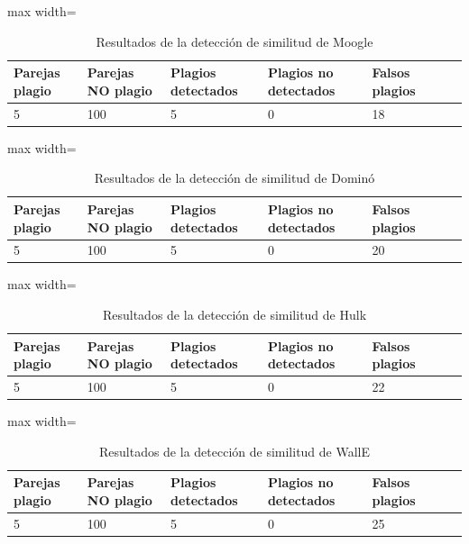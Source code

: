\begin{table}[ht]
\centering
\begin{adjustbox}{max width=\textwidth}
\begin{tabular}{|p{2cm}|p{2cm}|p{2cm}|p{2cm}|p{2cm}|p{2cm}|p{2cm}|}
\hline
\textbf{Parejas plagio} & \textbf{Parejas NO plagio} & \textbf{Plagios detectados} & \textbf{Plagios no detectados} & \textbf{Falsos plagios}  \\ \hline
5 & 100 & 5 & 0 & 18  \\ \hline
\end{tabular}
\end{adjustbox}
\caption{Resultados de la detección de similitud de Moogle}
\label{tab:moogle}
\end{table}



\begin{table}[ht]
\centering
\begin{adjustbox}{max width=\textwidth}
\begin{tabular}{|p{2cm}|p{2cm}|p{2cm}|p{2cm}|p{2cm}|p{2cm}|p{2cm}|}
\hline
\textbf{Parejas plagio} & \textbf{Parejas NO plagio} & \textbf{Plagios detectados} & \textbf{Plagios no detectados} & \textbf{Falsos plagios}  \\ \hline
5 & 100 & 5 & 0 & 20  \\ \hline
\end{tabular}
\end{adjustbox}
\caption{Resultados de la detección de similitud de Dominó}
\label{tab:Domino}
\end{table}


\begin{table}[ht]
\centering
\begin{adjustbox}{max width=\textwidth}
\begin{tabular}{|p{2cm}|p{2cm}|p{2cm}|p{2cm}|p{2cm}|p{2cm}|p{2cm}|}
\hline
\textbf{Parejas plagio} & \textbf{Parejas NO plagio} & \textbf{Plagios detectados} & \textbf{Plagios no detectados} & \textbf{Falsos plagios}  \\ \hline
5 & 100 & 5 & 0 & 22  \\ \hline
\end{tabular}
\end{adjustbox}
\caption{Resultados de la detección de similitud de Hulk}
\label{tab:Hulk}
\end{table}



\begin{table}[ht]
\centering
\begin{adjustbox}{max width=\textwidth}
\begin{tabular}{|p{2cm}|p{2cm}|p{2cm}|p{2cm}|p{2cm}|p{2cm}|p{2cm}|}
\hline
\textbf{Parejas plagio} & \textbf{Parejas NO plagio} & \textbf{Plagios detectados} & \textbf{Plagios no detectados} & \textbf{Falsos plagios}  \\ \hline
5 & 100 & 5 & 0 & 25  \\ \hline
\end{tabular}
\end{adjustbox}
\caption{Resultados de la detección de similitud de WallE}
\label{tab:WallE}
\end{table}

